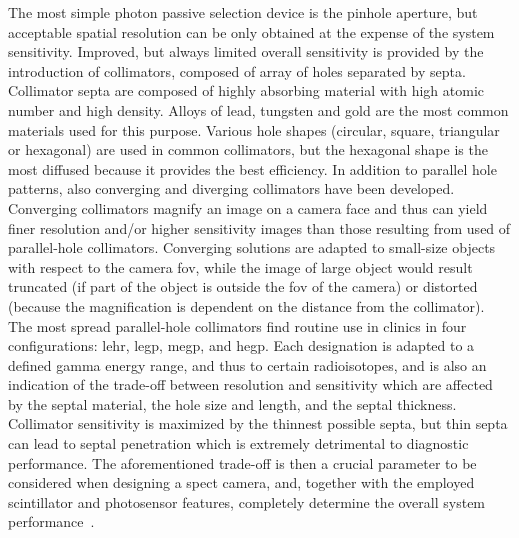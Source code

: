 The most simple photon passive selection device is the pinhole aperture, but acceptable spatial resolution can be only obtained at the expense of the system sensitivity. Improved, but always limited overall sensitivity is provided by the introduction of collimators, composed of array of holes separated by septa.  Collimator septa are composed of highly absorbing material with high atomic number and high density. Alloys of lead, tungsten and gold are the most common materials used for this purpose. 
Various hole shapes (circular, square, triangular or hexagonal) are used in common collimators, but the hexagonal shape is the most diffused because it provides the best efficiency. In addition to parallel hole patterns, also converging and diverging collimators have been developed. Converging collimators magnify an image on a camera face and thus can yield finer resolution and/or higher sensitivity images than those resulting from used of parallel-hole collimators. Converging solutions are adapted to small-size objects with respect to the camera \gls{fov}, while the image of large object would result truncated (if part of the object is outside the \gls{fov} of the camera) or distorted (because the magnification is dependent on the distance from the collimator). 
The most spread parallel-hole collimators find routine use in clinics in four configurations: \gls{lehr}, \gls{legp}, \gls{megp}, and \gls{hegp}. Each designation is adapted to a defined gamma energy range, and thus to certain radioisotopes, and is also an indication of the trade-off between resolution and sensitivity which are affected by the septal material, the hole size and length, and the septal thickness. Collimator sensitivity is maximized by the thinnest possible septa, but thin septa can lead to septal penetration which is extremely detrimental to diagnostic performance. The aforementioned trade-off is then a crucial parameter to be considered when designing a \gls{spect} camera, and, together with the employed scintillator and photosensor features, completely determine the overall system performance~\parencite{Gunter2004}.

